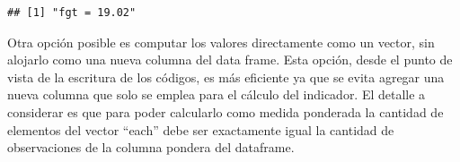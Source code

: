 \documentclass[
]{book}
\newenvironment{Shaded}{\begin{snugshade}}{\end{snugshade}}
\newcommand{\AttributeTok}[1]{\textcolor[rgb]{0.77,0.63,0.00}{#1}}
\newcommand{\CommentTok}[1]{\textcolor[rgb]{0.56,0.35,0.01}{\textit{#1}}}
\newcommand{\ConstantTok}[1]{\textcolor[rgb]{0.00,0.00,0.00}{#1}}
\newcommand{\DecValTok}[1]{\textcolor[rgb]{0.00,0.00,0.81}{#1}}
\newcommand{\FloatTok}[1]{\textcolor[rgb]{0.00,0.00,0.81}{#1}}
\newcommand{\FunctionTok}[1]{\textcolor[rgb]{0.00,0.00,0.00}{#1}}
\newcommand{\NormalTok}[1]{#1}
\newcommand{\OtherTok}[1]{\textcolor[rgb]{0.56,0.35,0.01}{#1}}
\newcommand{\SpecialCharTok}[1]{\textcolor[rgb]{0.00,0.00,0.00}{#1}}
\newcommand{\StringTok}[1]{\textcolor[rgb]{0.31,0.60,0.02}{#1}}
\begin{document}
\begin{Shaded}
\end{Shaded}

\begin{verbatim}
## [1] "fgt = 19.02"
\end{verbatim}

Otra opción posible es computar los valores directamente como un vector, sin alojarlo como una nueva columna del data frame. Esta opción, desde el punto de vista de la escritura de los códigos, es más eficiente ya que se evita agregar una nueva columna que solo se emplea para el cálculo del indicador. El detalle a considerar es que para poder calcularlo como medida ponderada la cantidad de elementos del vector ``each'' debe ser exactamente igual la cantidad de observaciones de la columna pondera del dataframe.
\end{document}
